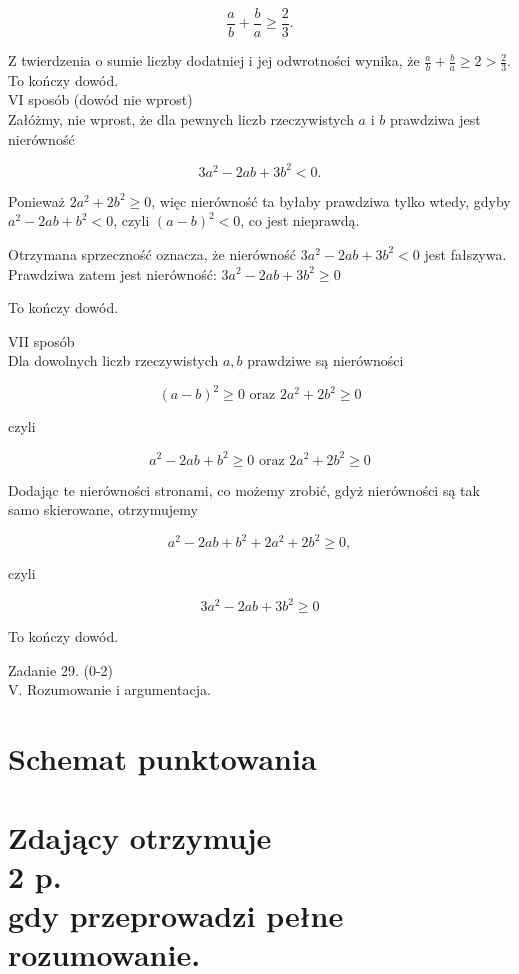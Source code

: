 \documentclass[10pt]{article}
\begin{document}
$$
\frac{a}{b}+\frac{b}{a} \geq \frac{2}{3} .
$$

Z twierdzenia o sumie liczby dodatniej i jej odwrotności wynika, że $\frac{a}{b}+\frac{b}{a} \geq 2>\frac{2}{3}$.\\
To kończy dowód.\\
VI sposób (dowód nie wprost)\\
Załóżmy, nie wprost, że dla pewnych liczb rzeczywistych $a$ i $b$ prawdziwa jest nierówność

$$
3 a^{2}-2 a b+3 b^{2}<0 .
$$

Ponieważ $2 a^{2}+2 b^{2} \geq 0$, więc nierówność ta byłaby prawdziwa tylko wtedy, gdyby $a^{2}-2 a b+b^{2}<0$, czyli $(a-b)^{2}<0$, co jest nieprawdą.

Otrzymana sprzeczność oznacza, że nierówność $3 a^{2}-2 a b+3 b^{2}<0$ jest fałszywa.\\
Prawdziwa zatem jest nierówność: $3 a^{2}-2 a b+3 b^{2} \geq 0$

To kończy dowód.

VII sposób\\
Dla dowolnych liczb rzeczywistych $a, b$ prawdziwe są nierówności

$$
(a-b)^{2} \geq 0 \text { oraz } 2 a^{2}+2 b^{2} \geq 0
$$

czyli

$$
a^{2}-2 a b+b^{2} \geq 0 \text { oraz } 2 a^{2}+2 b^{2} \geq 0
$$

Dodając te nierówności stronami, co możemy zrobić, gdyż nierówności są tak samo skierowane, otrzymujemy

$$
a^{2}-2 a b+b^{2}+2 a^{2}+2 b^{2} \geq 0,
$$

czyli

$$
3 a^{2}-2 a b+3 b^{2} \geq 0
$$

To kończy dowód.

Zadanie 29. (0-2)\\
V. Rozumowanie i argumentacja.

\section*{Schemat punktowania}
\section*{Zdający otrzymuje \\
 2 p. \\
 gdy przeprowadzi pełne rozumowanie.}
\end{document}
